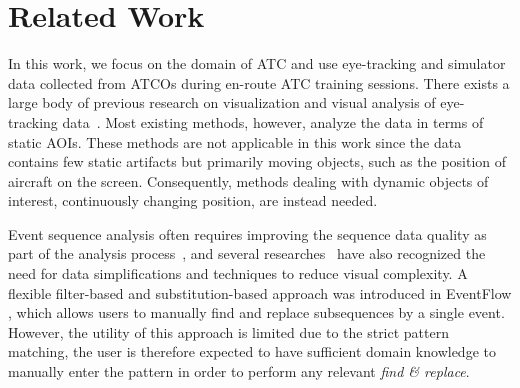 \documentclass[camera]{vgtc}                          %
\begin{document}
\vspace{-4pt}
\section{Related Work}
\label{sec:rw}
In this work, we focus on the domain of ATC and use eye-tracking and simulator data collected from ATCOs during en-route ATC training sessions. 
There exists a large body of previous research on visualization and visual analysis of eye-tracking data~\cite{Blascheck2014State, Raschke2014Visual, Burch2021Eye}. Most existing methods, however, analyze the data in terms of static AOIs. These methods are not applicable in this work since the data contains few static artifacts but primarily moving objects, such as the position of aircraft on the screen. Consequently, methods dealing with dynamic objects of interest, continuously changing position, are instead needed. 

Event sequence analysis often requires improving the sequence data quality as part of the analysis process~\cite{Kandel2011Research, Florian2015Data, Furche2016Data}, and several researches~\cite{Monroe2013Temporal, Guo2018EventThread, Chen2018Sequence, Gotz2014DecisionFlow, Wongsuphasawat2011LifeFlow, Cappers2018Exploring, Mathisen2017Clear, Nguyen2020VASABI, Bertens2016Keeping, Gschwandtner2014TimeCleanser} have also recognized the need for data simplifications and techniques to reduce visual complexity.
A flexible filter-based and substitution-based approach was introduced in EventFlow \cite{Monroe2013Temporal}, which allows users to manually find and replace subsequences by a single event. However, the utility of this approach is limited due to the strict pattern matching, the user is therefore expected to have sufficient domain knowledge to manually enter the pattern in order to perform any relevant \textit{find \& replace}.
\end{document}
